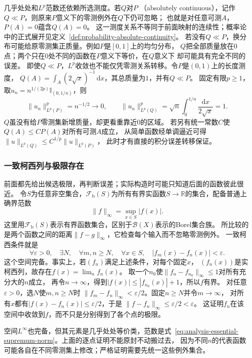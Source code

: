 几乎处处和$L^p$范数还依赖所选测度。若$Q$对$P$
（absolutely continuous），记作$Q\ll P$，则原来$P$意义下的零测例外在$Q$下仍可忽略；
也就是对任意可测$A$，$P(A)=0$蕴含$Q(A)=0$。
这一测度关系不等同于前面映射的连续性；概率论中的正式展开见定义~\ref{def:probability-absolute-continuity}。
若没有$Q\ll P$，换分布可能给原零测集正质量。例如$P$是$[0,1]$上的均匀分布，
$Q$把全部质量放在$0$点；两个只在$0$处不同的函数在$P$意义下等价，在$Q$意义下
却可能具有完全不同的误差。
即使$Q\ll P$，$L^p$收敛也不能仅凭零测关系转移。令$P$是$(0,1)$上的长度测度，
$Q(A)=\int_A(2\sqrt x)^{-1}\,\mathrm dx$，其总质量为$1$，并有$Q\ll P$。
固定有限$p\geq1$，取$u_n=n^{1/(2p)}\mathbb I_{(0,1/n)}$，则
\[
 \lVert u_n\rVert_{L^p(P)}^p=n^{-1/2}\to0,\qquad
 \lVert u_n\rVert_{L^p(Q)}^p
 =\sqrt n\int_0^{1/n}\frac{\mathrm dx}{2\sqrt x}=1.
\]
$Q$虽没有给$P$零测集新增质量，却更看重靠近$0$的区域。
若另有统一常数$C$使$Q(A)\leq CP(A)$对所有可测$A$成立，
从简单函数经单调逼近可得$\lVert u\rVert_{L^p(Q)}
\leq C^{1/p}\lVert u\rVert_{L^p(P)}$，
此时才有直接的积分误差转移保证。

\subsubsection{一致柯西列与极限存在}
前面都先给出候选极限，再判断误差；实际构造时可能只知道后面的函数彼此很近。
令$S$为任意非空集合，$\mathcal F_{\mathrm b}(S)$为所有有界实函数$S\to\mathbb{R}$的集合，配备普通上确界范数
\[   \lVert f\rVert_{\infty}   =   \sup_{x\in S}|f(x)|. \]
这里用$\mathcal F_{\mathrm b}(S)$表示有界函数集合，区别于$\mathcal B(X)$表示的Borel集合族。
所比较的是两个函数之间的距离$\lVert f-g\rVert_\infty$，它检查每个输入而不忽略零测例外。
一致柯西条件就是
\[
 \forall\varepsilon>0,\quad\exists N,\quad
 \forall m,n\geq N,\quad\forall x\in S,\quad
 |f_m(x)-f_n(x)|<\varepsilon.
\]
这个空间完备。事实上，若$(f_n)$满足上述条件，对每个固定$x$，
$(f_n(x))$是实柯西列，故存在$f(x)=\lim_n f_n(x)$。
取一个$n_0$使$\lVert f_n-f_{n_0}\rVert_\infty\leq1$对所有充分大的$n$成立，
再令$n\to\infty$，得到$|f(x)|\leq|f_{n_0}(x)|+1$，所以$f$有界。
对任意$\varepsilon>0$，选$N$使$m,n\geq N$时
$\lVert f_m-f_n\rVert_\infty<\varepsilon/2$。固定$n\geq N$并令$m\to\infty$，
对所有$x$都有$|f(x)-f_n(x)|\leq\varepsilon/2$，于是
$\lVert f-f_n\rVert_\infty\leq\varepsilon/2<\varepsilon$。
这证明$f_n$在该空间中收敛到$f$，而不只是分别得到了各个点的极限。

空间$L^\infty$也完备，但其元素是几乎处处等价类，范数是式~\eqref{eq:analysis-essential-supremum-norm}。上面的逐点证明不能原封不动搬过去， 因为不同$n$的代表函数可能各自在不同零测集上修改；严格证明需要先统一这些例外集合。


